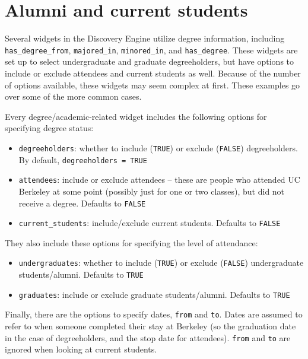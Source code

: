\documentclass[]{book}
\providecommand{\tightlist}{%
  \setlength{\itemsep}{0pt}\setlength{\parskip}{0pt}}
\begin{document}
\hypertarget{ex-academic}{%
\chapter{Alumni and current students}\label{ex-academic}}

Several widgets in the Discovery Engine utilize degree information, including \texttt{has\_degree\_from}, \texttt{majored\_in}, \texttt{minored\_in}, and \texttt{has\_degree}. These widgets are set up to select undergraduate and graduate degreeholders, but have options to include or exclude attendees and current students as well. Because of the number of options available, these widgets may seem complex at first. These examples go over some of the more common cases.

Every degree/academic-related widget includes the following options for specifying degree status:

\begin{itemize}
\tightlist
\item
  \texttt{degreeholders}: whether to include (\texttt{TRUE}) or exclude (\texttt{FALSE}) degreeholders. By default, \texttt{degreeholders\ =\ TRUE}
\item
  \texttt{attendees}: include or exclude attendees -- these are people who attended UC Berkeley at some point (possibly just for one or two classes), but did not receive a degree. Defaults to \texttt{FALSE}
\item
  \texttt{current\_students}: include/exclude current students. Defaults to \texttt{FALSE}
\end{itemize}

They also include these options for specifying the level of attendance:

\begin{itemize}
\tightlist
\item
  \texttt{undergraduates}: whether to include (\texttt{TRUE}) or exclude (\texttt{FALSE}) undergraduate students/alumni. Defaults to \texttt{TRUE}
\item
  \texttt{graduates}: include or exclude graduate students/alumni. Defaults to \texttt{TRUE}
\end{itemize}

Finally, there are the options to specify dates, \texttt{from} and \texttt{to}. Dates are assumed to refer to when someone completed their stay at Berkeley (so the graduation date in the case of degreeholders, and the stop date for attendees). \texttt{from} and \texttt{to} are ignored when looking at current students.
\end{document}
